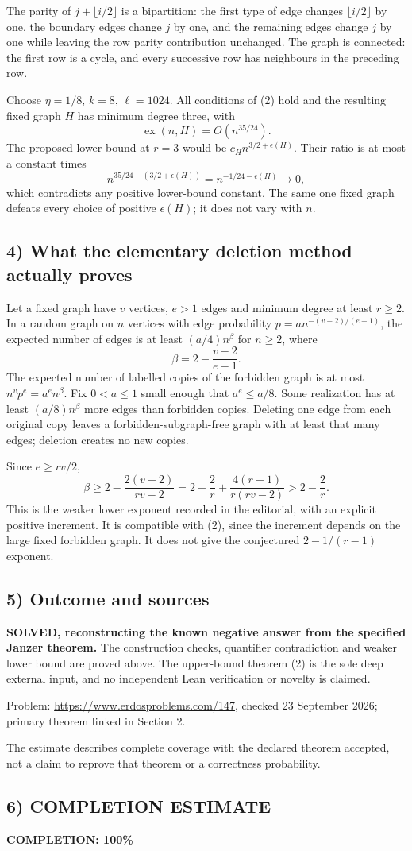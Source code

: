 The parity of $j+\lfloor i/2\rfloor$ is a bipartition: the first type of edge changes $\lfloor i/2\rfloor$ by one, the boundary edges change $j$ by one, and the remaining edges change $j$ by one while leaving the row parity contribution unchanged. The graph is connected: the first row is a cycle, and every successive row has neighbours in the preceding row.

Choose $\eta=1/8$, $k=8$, $\ell=1024$. All conditions of (2) hold and the resulting fixed graph $H$ has minimum degree three, with
\[
 \operatorname{ex}(n,H)=O(n^{35/24}).
\]
The proposed lower bound at $r=3$ would be $c_H n^{3/2+\epsilon(H)}$. Their ratio is at most a constant times
\[
 n^{35/24-(3/2+\epsilon(H))}=n^{-1/24-\epsilon(H)}\longrightarrow0,
\]
which contradicts any positive lower-bound constant. The same one fixed graph defeats every choice of positive $\epsilon(H)$; it does not vary with $n$.

\subsection*{4) What the elementary deletion method actually proves}
Let a fixed graph have $v$ vertices, $e>1$ edges and minimum degree at least $r\ge2$. In a random graph on $n$ vertices with edge probability $p=a n^{-(v-2)/(e-1)}$, the expected number of edges is at least $(a/4)n^{\beta}$ for $n\ge2$, where
\[
 \beta=2-\frac{v-2}{e-1}.
\]
The expected number of labelled copies of the forbidden graph is at most $n^vp^e=a^e n^\beta$. Fix $0<a\le1$ small enough that $a^e\le a/8$. Some realization has at least $(a/8)n^\beta$ more edges than forbidden copies. Deleting one edge from each original copy leaves a forbidden-subgraph-free graph with at least that many edges; deletion creates no new copies.

Since $e\ge rv/2$,
\[
 \beta\ge2-\frac{2(v-2)}{rv-2}
 =2-\frac2r+\frac{4(r-1)}{r(rv-2)}>2-\frac2r.
\]
This is the weaker lower exponent recorded in the editorial, with an explicit positive increment. It is compatible with (2), since the increment depends on the large fixed forbidden graph. It does not give the conjectured $2-1/(r-1)$ exponent.

\subsection*{5) Outcome and sources}
\textbf{SOLVED, reconstructing the known negative answer from the specified Janzer theorem.} The construction checks, quantifier contradiction and weaker lower bound are proved above. The upper-bound theorem (2) is the sole deep external input, and no independent Lean verification or novelty is claimed.

Problem: \url{https://www.erdosproblems.com/147}, checked 23 September 2026; primary theorem linked in Section 2.

The estimate describes complete coverage with the declared theorem accepted, not a claim to reprove that theorem or a correctness probability.
\subsection*{6) COMPLETION ESTIMATE}
\textbf{COMPLETION: 100\%}
